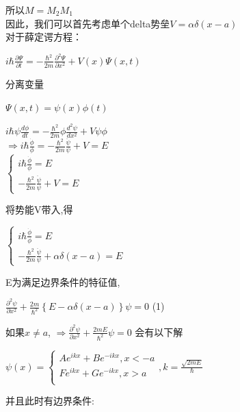 \documentclass[12pt, a4paper, oneside]{ctexart}
\begin{document}
\begin{spacing}{2.0}
所以$M=M_2 M_1$\\
因此，我们可以首先考虑单个delta势垒$V=\alpha\delta(x-a)$
\\对于薛定谔方程：
\begin{center}
  $\displaystyle i\hbar\frac{\partial \Psi}{\partial t} = -\frac{\hbar^2}{2 m} \frac{\partial^2 \Psi}{\partial x^2}+V(x) \Psi(x,t)$
\end{center}
分离变量
\begin{center}
$\displaystyle \Psi(x,t)=\psi(x)\phi(t)$
\end{center}
\begin{center}
$\displaystyle i\hbar\psi\frac{d\phi}{dt}=-\frac{\hbar^2}{2m} \phi\frac{d^2 \psi}{dx^2}+V\psi\phi$\\
$\displaystyle \Rightarrow i\hbar\frac{\dot\phi}{\phi}=-\frac{\hbar^2}{2m}\frac{\ddot\psi}{\psi}+V=E $\\
$\displaystyle \left\{\begin{matrix}    i\hbar\frac{\dot\phi}{\phi}=E \\     -\frac{\hbar^2}{2m}\frac{\ddot\psi}{\psi}+V=E  \end{matrix}\right. $\\
\end{center}
将势能V带入,得
\begin{center}
$\displaystyle \left\{\begin{matrix}    i\hbar\frac{\dot\phi}{\phi}=E \\     -\frac{\hbar^2}{2m}\frac{\ddot\psi}{\psi}+\alpha\delta(x-a)=E  \end{matrix}\right. $\\
\end{center}
E为满足边界条件的特征值,
\begin{center}
$\displaystyle \frac{\partial^2\psi}{\partial x^2}+\frac{2m}{\hbar^2} \left\{E-\alpha\delta(x-a)\right\}\psi=0$   (1)\\
\end{center}
如果$x\neq a$,
$\displaystyle \Rightarrow \frac{\partial^2\psi}{\partial x^2}+\frac{2mE}{\hbar^2}\psi=0 $
会有以下解
\begin{center}
$\displaystyle \psi(x)= \left\{\begin{matrix}    Ae^{ikx}+Be^{-ikx},x<-a \\  Fe^{ikx}+Ge^{-ikx},x>a\\  \end{matrix}\right. ,k=\frac{\sqrt{2mE}}{\hbar}$\\
\end{center}
并且此时有边界条件:

\end{spacing}
\end{document}
